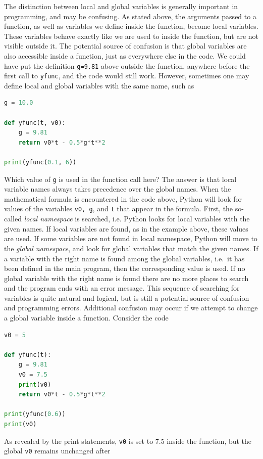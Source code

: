 \documentclass[graybox,envcountchap,sectrefs,final]{svmonodo}
\begin{document}
The distinction between local and global variables is generally important in programming, and may be confusing. As stated
above, the arguments passed to a function, as well as variables we define inside the function, become local variables. These
variables behave exactly like we are used to inside the function, but are not visible outside it. The potential source
of confusion is that global variables are also accessible inside a function, just as everywhere else in the code.
We could have put the definition \texttt{g=9.81} above outside the function, anywhere before the first call to \texttt{yfunc}, and the
code would still work. However, sometimes one may define local and global variables with the same name, such as
\begin{lstlisting}[language=Python,style=blue1bar]
g = 10.0

def yfunc(t, v0):
    g = 9.81
    return v0*t - 0.5*g*t**2

print(yfunc(0.1, 6))
\end{lstlisting}
Which value of \texttt{g} is used in the function call here? The answer is that local variable names always takes precedence
over the global names. When the mathematical formula is encountered in the code above, Python will look for values
of the variables \texttt{v0, g}, and \texttt{t} that appear in the formula. First, the so-called \emph{local namespace} is searched, i.e.
Python looks for local variables with the given names. If local variables are found, as in the example above, these values
are used. If some variables are not found in local namespace, Python will move to the \emph{global namespace}, and look for
global variables that match the given names. If a variable with the right name is found among the global
variables, i.e.~it has been defined in the main program, then the corresponding value is used.
If no global variable with the right name is found there are no more places to search and the program ends with an error message.
This sequence of searching for variables is quite natural and logical, but is still a potential
source of confusion and programming errors. Additional confusion may occur if we attempt to change a global variable
inside a function. Consider the code
\begin{lstlisting}[language=Python,style=blue1]
v0 = 5

def yfunc(t):
    g = 9.81
    v0 = 7.5
    print(v0)
    return v0*t - 0.5*g*t**2

print(yfunc(0.6))
print(v0)
\end{lstlisting}
As revealed by the print statements, \texttt{v0} is set to 7.5 inside the function, but the global \texttt{v0} remains unchanged after
\end{document}
